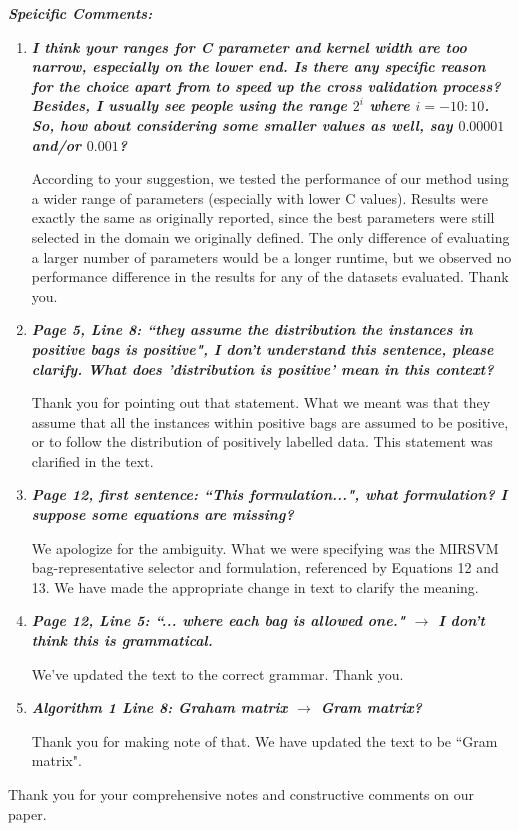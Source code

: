 \documentclass[a4paper,notitlepage]{article}
\begin{document}
\noindent \textbf{\textit{Speicific Comments:}}
\begin{enumerate}
\item \textbf{\textit{I think your ranges for C parameter and kernel width are too narrow, especially on the lower end. Is there any specific reason for the choice apart from to speed up the cross validation process? Besides, I usually see people using the range $2^i$ where $i = -10:10$. So, how about considering some smaller values as well, say $0.00001$ and/or $0.001$?}}

\medskip

\noindent According to your suggestion, we tested the performance of our method using a wider range of parameters (especially with lower C values). Results were exactly the same as originally reported, since the best parameters were still selected in the domain we originally defined. The only difference of evaluating a larger number of parameters would be a longer runtime, but we observed no performance difference in the results for any of the datasets evaluated. Thank you.

\item \textbf{\textit{Page 5, Line 8: ``they assume the distribution the instances in positive bags is positive", I don't understand this sentence, please clarify. What does 'distribution is positive' mean in this context?}}

\medskip

\noindent Thank you for pointing out that statement. What we meant was that they assume that all the instances within positive bags are assumed to be positive, or to follow the distribution of positively labelled data. This statement was clarified in the text.

\item \textbf{\textit{Page 12, first sentence: ``This formulation...", what formulation? I suppose some equations are missing?}}

\medskip

\noindent We apologize for the ambiguity. What we were specifying was the MIRSVM bag-representative selector and formulation, referenced by Equations 12 and 13. We have made the appropriate change in text to clarify the meaning. 

\item \textbf{\textit{Page 12, Line 5: ``... where each bag is allowed one." $\rightarrow$ I don't think this is grammatical.}}

\medskip

\noindent We've updated the text to the correct grammar. Thank you.

\item \textbf{\textit{Algorithm 1 Line 8: Graham matrix $\rightarrow$ Gram matrix?}}

\medskip

\noindent Thank you for making note of that. We have updated the text to be ``Gram matrix".

\end{enumerate}

\medskip

\noindent Thank you for your comprehensive notes and constructive comments on our paper. 
\end{document}
